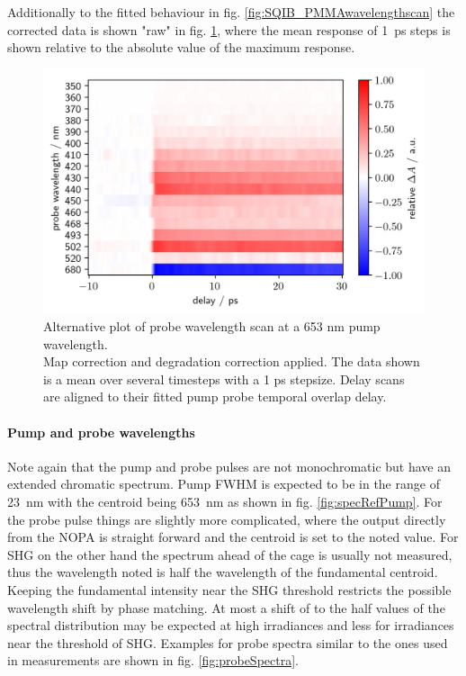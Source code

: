 \documentclass[twoside,openright]{scrreprt}
\begin{document}
{Additionally to the fitted behaviour in fig. \ref{fig:SQIB_PMMAwavelengthscan} the corrected data is shown "raw" in fig. \ref{fig:SQIB_PMMA_rawWavs}, where the mean response of \SI{1}{\pico\second} steps is shown relative to the absolute value of the maximum response.
\begin{figure}[htp]
\centering
\includegraphics[scale=1]{images/RawishDataWavelengthScanSHG.png}
\caption{Alternative plot of probe wavelength scan at a 653 nm pump wavelength.\\Map correction and degradation correction applied. The data shown is a mean over several timesteps with a 1 ps stepsize. Delay scans are aligned to their fitted pump probe temporal overlap delay.\label{fig:SQIB_PMMA_rawWavs}}
\end{figure}
\paragraph{Pump and probe wavelengths}
Note again that the pump and probe pulses are not monochromatic but have an extended chromatic spectrum. Pump FWHM is expected to be in the range of \SI{23}{\nano\meter} with the centroid being \SI{653}{\nano\meter} as shown in fig. \ref{fig:specRefPump}. For the probe pulse things are slightly more complicated, where the output directly from the NOPA is straight forward and the centroid is set to the noted value. For SHG on the other hand the spectrum ahead of the cage is usually not measured, thus the wavelength noted is half the wavelength of the fundamental centroid. Keeping the fundamental intensity near the SHG threshold restricts the possible wavelength shift by phase matching. At most a shift of to the half values of the spectral distribution may be expected at high irradiances and less for irradiances near the threshold of SHG. Examples for probe spectra similar to the ones used in measurements are shown in fig. \ref{fig:probeSpectra}.
}
\end{document}
